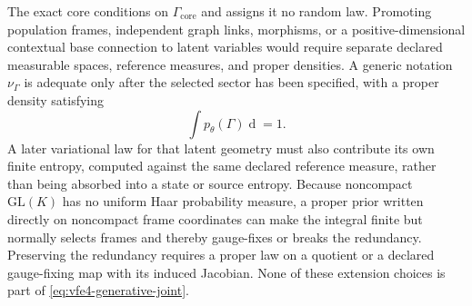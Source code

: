 The exact core conditions on $\Gamma_{\mathrm{core}}$ and assigns it no random law. Promoting population frames, independent graph links, morphisms, or a positive-dimensional contextual base connection to latent variables would require separate declared measurable spaces, reference measures, and proper densities. A generic notation $\nu_\Gamma$ is adequate only after the selected sector has been specified, with a proper density satisfying
\begin{equation}
\int p_\theta(\Gamma)\mathop{\mathrm d\nu_\Gamma(\Gamma)}=1.
\label{eq:proper-latent-geometry-prior}
\end{equation}
A later variational law for that latent geometry must also contribute its own finite entropy, computed against the same declared reference measure, rather than being absorbed into a state or source entropy.  Because noncompact $\mathrm{GL}(K)$ has no uniform Haar probability measure, a proper prior written directly on noncompact frame coordinates can make the integral finite but normally selects frames and thereby gauge-fixes or breaks the redundancy. Preserving the redundancy requires a proper law on a quotient or a declared gauge-fixing map with its induced Jacobian. None of these extension choices is part of \cref{eq:vfe4-generative-joint}.
